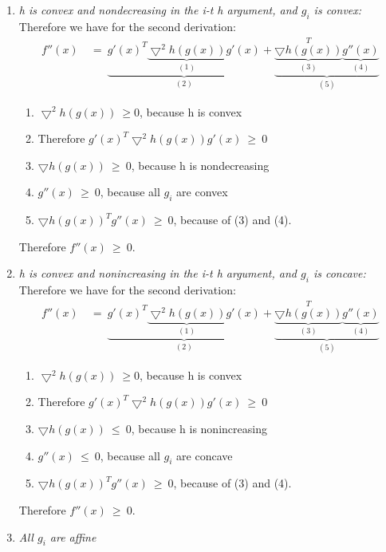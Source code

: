 \documentclass{report}
\begin{document}
		\begin{enumerate}[1.]
			\item \textit{h is convex and nondecreasing in the i-t h argument, and $g_i$ is convex:} \\
			Therefore we have for the second derivation:
			\begin{align*}
				f''(x) \ & = \ \underbrace{g'(x)^T \underbrace{\bigtriangledown ^2 h(g(x))}_{(1)} g'(x)}_{(2)} + \underbrace{\underbrace{\bigtriangledown h(g(x))}_{(3)}^T \underbrace{g''(x)}_{(4)}}_{(5)}
			\end{align*}
			\begin{enumerate}[(1)]
				\item $\bigtriangledown ^2 h(g(x)) \ \geq 0$, because h is convex
				\item Therefore $g'(x)^T \bigtriangledown ^2 h(g(x)) g'(x) \ \geq \ 0$
				\item $\bigtriangledown h(g(x)) \ \geq \ 0$, because h is nondecreasing
				\item $g''(x) \ \geq \ 0$, because all $g_i$ are convex
				\item $\bigtriangledown h(g(x)) ^T g''(x) \ \geq \ 0$, because of (3) and (4).
			\end{enumerate}
			Therefore $f''(x) \ \geq \ 0$.
			\item \textit{h is convex and nonincreasing in the i-t h argument, and $g_i$ is concave:} \\
			Therefore we have for the second derivation:
			\begin{align*}
				f''(x) \ & = \ \underbrace{g'(x)^T \underbrace{\bigtriangledown ^2 h(g(x))}_{(1)} g'(x)}_{(2)} + \underbrace{\underbrace{\bigtriangledown h(g(x))}_{(3)}^T \underbrace{g''(x)}_{(4)}}_{(5)}
			\end{align*}
			\begin{enumerate}[(1)]
				\item $\bigtriangledown ^2 h(g(x)) \ \geq 0$, because h is convex
				\item Therefore $g'(x)^T \bigtriangledown ^2 h(g(x)) g'(x) \ \geq \ 0$
				\item $\bigtriangledown h(g(x)) \ \leq \ 0$, because h is nonincreasing
				\item $g''(x) \ \leq \ 0$, because all $g_i$ are concave
				\item $\bigtriangledown h(g(x)) ^T g''(x) \ \geq \ 0$, because of (3) and (4).
			\end{enumerate}
			Therefore $f''(x) \ \geq \ 0$.
			\item \textit{All $g_i$ are affine} \\

\end{enumerate}
\end{document}
